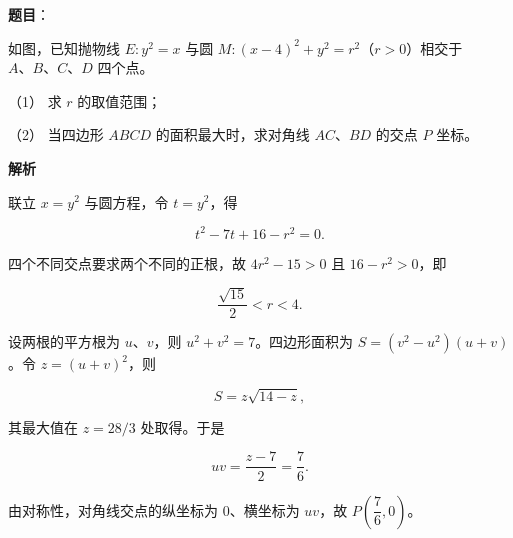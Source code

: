 \begin{answer}

\textbf{题目}：

如图，已知抛物线 $E:y^2=x$ 与圆 $M:(x-4)^2+y^2=r^2$（$r>0$）相交于 $A\text{、}B\text{、}C\text{、}D$ 四个点。
\nopagebreak[4]
\begin{center}\end{center}
\nopagebreak[4]
（1） 求 $r$ 的取值范围；

（2） 当四边形 $ABCD$ 的面积最大时，求对角线 $AC\text{、}BD$ 的交点 $P$ 坐标。

\textbf{解析}


联立 $x=y^2$ 与圆方程，令 $t=y^2$，得

\nopagebreak[4]
\[
t^2-7t+16-r^2=0.
\]

四个不同交点要求两个不同的正根，故
$4r^2-15>0$ 且 $16-r^2>0$，即

\nopagebreak[4]
\[
\frac{\sqrt{15}}2<r<4.
\]


设两根的平方根为 $u\text{、}v$，则 $u^2+v^2=7$。四边形面积为
$S=(v^2-u^2)(u+v)$。令 $z=(u+v)^2$，则

\nopagebreak[4]
\[
S=z\sqrt{14-z},
\]

其最大值在 $z=28/3$ 处取得。于是

\nopagebreak[4]
\[
uv=\frac{z-7}{2}=\frac76.
\]

由对称性，对角线交点的纵坐标为 $0$、横坐标为 $uv$，故
$P\left(\dfrac76,0\right)$。



\end{answer}